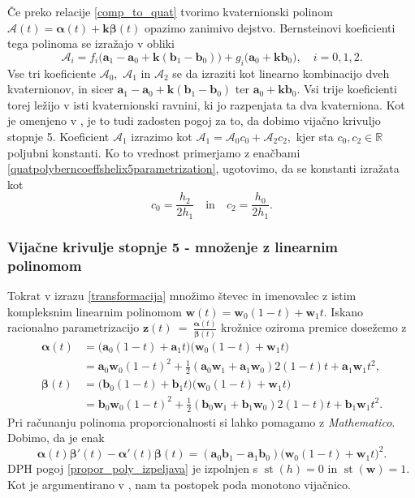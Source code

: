\documentclass[12pt,a4paper,twoside]{article}
\theoremstyle{definition} %
\theoremstyle{plain} %
\theoremstyle{primerstyle}
\numberwithin{equation}{section}  %
\newcommand{\R}{\mathbb R}
\newcommand{\aV}{\mathbf{a}}
\newcommand{\bV}{\mathbf{b}}
\newcommand{\kV}{\mathbf{k}}
\newcommand{\wV}{\mathbf{w}}
\newcommand{\zV}{\mathbf{z}}
\newcommand{\AQ}{\mathcal{A}}
\newcommand{\balpha}{\boldsymbol \alpha}
\newcommand{\bbeta}{\boldsymbol \beta}
\DeclareMathOperator{\st}{st}
\begin{document}
Če preko relacije \eqref{comp_to_quat} tvorimo kvaternionski polinom $\AQ(t)=\balpha(t)+\kV\bbeta(t)$ opazimo zanimivo dejstvo. Bernsteinovi koeficienti tega polinoma se izražajo v obliki
\begin{equation}
	\label{quatpolyberncoeffshelix5parametrization}
	\AQ_i=f_i\big(\aV_1-\aV_0+\kV(\bV_1-\bV_0)\big)+g_i\big(\aV_0+\kV\bV_0\big),\quad i=0,1,2.
\end{equation}
Vse tri koeficiente $\AQ_0,$ $\AQ_1$ in $\AQ_2$ se da izraziti kot linearno kombinacijo dveh kvaternionov, in sicer $\aV_1-\aV_0+\kV(\bV_1-\bV_0)$ ter $\aV_0+\kV\bV_0.$ Vsi trije koeficienti torej ležijo v isti kvaternionski ravnini, ki jo razpenjata ta dva kvaterniona. Kot je omenjeno v \cite[trditev 1]{faroukietal2004}, je to tudi zadosten pogoj za to, da dobimo vijačno krivuljo stopnje 5. Koeficient $\AQ_1$ izrazimo kot $\AQ_1=\AQ_0c_0+\AQ_2c_2,$ kjer sta $c_0,c_2\in\R$ poljubni konstanti. Ko to vrednost primerjamo z enačbami \eqref{quatpolyberncoeffshelix5parametrization}, ugotovimo, da se konstanti izražata kot
\begin{equation*}
	c_0=\frac{h_2}{2h_1}\quad\text{in}\quad c_2=\frac{h_0}{2h_1}.
\end{equation*}

\subsubsection{Vijačne krivulje stopnje 5 - množenje z linearnim polinomom}
\label{mnozenje_linearni_polinom_5}

Tokrat v izrazu \eqref{transformacija} množimo števec in imenovalec z istim kompleksnim linearnim polinomom $\wV(t)=\wV_0(1-t)+\wV_1t.$ Iskano racionalno parametrizacijo $\zV(t)~=~\frac{\balpha(t)}{\bbeta(t)}$ krožnice oziroma premice dosežemo z
\begin{align}
	\balpha(t)&=\big(\aV_0(1-t)+\aV_1t\big)\big(\wV_0(1-t)+\wV_1t\big)\nonumber\\
	&=\aV_0\wV_0(1-t)^2+\frac{1}{2}(\aV_0\wV_1+\aV_1\wV_0)2(1-t)t+\aV_1\wV_1t^2,\label{kompl_polinoma_mnozenje_lin_pol}\\
	\bbeta(t)&=\big(\bV_0(1-t)+\bV_1t\big)\big(\wV_0(1-t)+\wV_1t\big)\nonumber\\
	&=\bV_0\wV_0(1-t)^2+\frac{1}{2}(\bV_0\wV_1+\bV_1\wV_0)2(1-t)t+\bV_1\wV_1t^2.\nonumber
\end{align}
Pri računanju polinoma proporcionalnosti si lahko pomagamo z \emph{Mathematico}. Dobimo, da je enak
\begin{equation*}
	\balpha(t)\bbeta'(t)-\balpha'(t)\bbeta(t)=(\aV_0\bV_1-\aV_1\bV_0)\big(\wV_0(1-t)+\wV_1t\big)^2.
\end{equation*}
DPH pogoj \eqref{propor_poly_izpeljava} je izpolnjen s $\st(h)=0$ in $\st(\wV)=1.$ Kot je argumentirano v \cite{beltranmonterde}, nam ta postopek poda monotono vijačnico.
\end{document}
